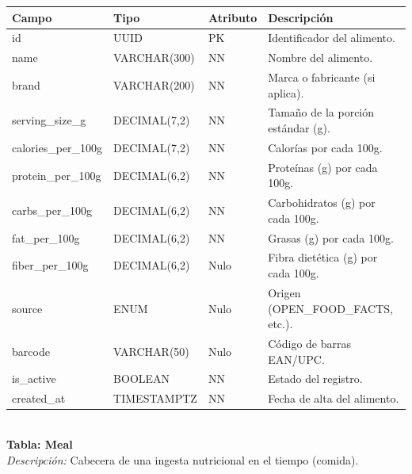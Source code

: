 \documentclass[12pt]{article}
\begin{document}
\begin{table}[h!]
    \centering
    \renewcommand{\arraystretch}{1.2}
    \small
    \begin{tabular}{|p{3.5cm}|p{2.7cm}|p{2cm}|p{6.5cm}|}
        \hline
        \rowcolor[HTML]{EFEFEF}
        \textbf{Campo} & \textbf{Tipo} & \textbf{Atributo} & \textbf{Descripción} \\ \hline
        id & UUID & PK & Identificador del alimento. \\ \hline
        name & VARCHAR(300) & NN & Nombre del alimento. \\ \hline
        brand & VARCHAR(200) & NN & Marca o fabricante (si aplica). \\ \hline
        serving\_size\_g & DECIMAL(7,2) & NN & Tamaño de la porción estándar (g). \\ \hline
        calories\_per\_100g & DECIMAL(7,2) & NN & Calorías por cada 100g. \\ \hline
        protein\_per\_100g & DECIMAL(6,2) & NN & Proteínas (g) por cada 100g. \\ \hline
        carbs\_per\_100g & DECIMAL(6,2) & NN & Carbohidratos (g) por cada 100g. \\ \hline
        fat\_per\_100g & DECIMAL(6,2) & NN & Grasas (g) por cada 100g. \\ \hline
        fiber\_per\_100g & DECIMAL(6,2) & Nulo & Fibra dietética (g) por cada 100g. \\ \hline
        source & ENUM & Nulo & Origen (OPEN\_FOOD\_FACTS, etc.). \\ \hline
        barcode & VARCHAR(50) & Nulo & Código de barras EAN/UPC. \\ \hline
        is\_active & BOOLEAN & NN & Estado del registro. \\ \hline
        created\_at & TIMESTAMPTZ & NN & Fecha de alta del alimento. \\ \hline
    \end{tabular}
\end{table}
\\
\noindent\textbf{Tabla: Meal} \\
\textit{Descripción:} Cabecera de una ingesta nutricional en el tiempo (comida).
\end{document}
